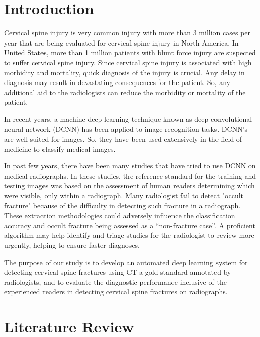 \documentclass[pdflatex,sn-mathphys]{sn-jnl}%
\theoremstyle{thmstyleone}%
\theoremstyle{thmstyletwo}%
\theoremstyle{thmstylethree}%
\begin{document}
\section{Introduction}\label{sec1}

Cervical spine injury is very common injury with more than 3 million cases per year that are being evaluated for cervical spine injury in North America\cite{Milby:2008tt}. In United States, more than 1 million patients with blunt force injury are suspected to suffer cervical spine injury\cite{Minja:2018ud}. Since cervical spine injury is associated with high morbidity and mortality, quick diagnosis of the injury is crucial. Any delay in diagnosis may result in devastating consequences for the patient. So, any additional aid to the radiologists can reduce the morbidity or mortality of the patient.

In recent years, a machine deep learning technique known as deep convolutional neural network (DCNN) has been applied to image recognition tasks. DCNN's are well suited for images. So, they have been used extensively in the field of medicine to classify medical images. 

In past few years, there have been many studies that have tried to use DCNN\cite{Olczak:2017aa}\cite{Kim:2018aa}\cite{Chung:2018aa} on medical radiographs. In these studies, the reference standard for the training and testing images was based on the assessment of human readers determining which were visible, only within a radiograph. Many radiologist fail to detect "occult fracture" because of the difficulty in detecting such fracture in a radiograph. These extraction methodologies could adversely influence the classification accuracy and occult fracture being assessed as a “non-fracture case”. A proficient algorithm may help identify and triage studies for the radiologist to review more urgently, helping to ensure faster diagnoses.

The purpose of our study is to develop an automated deep learning system for detecting cervical spine fractures using CT a gold standard annotated by radiologists, and to evaluate the diagnostic performance inclusive of the experienced readers in detecting cervical spine fractures on radiographs. 

\section{Literature Review}\label{litrev}
\end{document}
